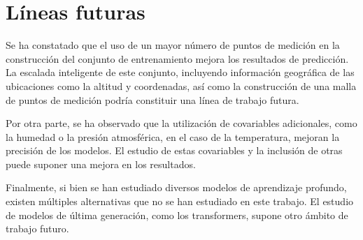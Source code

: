 \section{Líneas futuras}

Se ha constatado que el uso de un mayor número de puntos de medición en la construcción del conjunto de entrenamiento mejora los resultados de predicción.
La escalada inteligente de este conjunto, incluyendo información geográfica de las ubicaciones como la altitud y coordenadas, así como la construcción de una malla 
de puntos de medición podría constituir una línea de trabajo futura.

Por otra parte, se ha observado que la utilización de covariables adicionales, como la humedad o la presión atmosférica, en el caso de la temperatura, mejoran la precisión de los modelos.
El estudio de estas covariables y la inclusión de otras puede suponer una mejora en los resultados.

Finalmente, si bien se han estudiado diversos modelos de aprendizaje profundo, existen múltiples alternativas que no se han estudiado en este trabajo.
El estudio de modelos de última generación, como los transformers, supone otro ámbito de trabajo futuro.